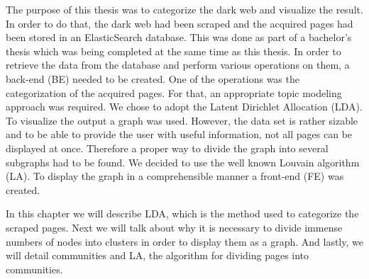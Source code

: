 The purpose of this thesis was to categorize the dark web and visualize the result. In order to do that, the dark web had been scraped and the acquired pages had been stored in an ElasticSearch database. This was done as part of a bachelor's thesis which was being completed at the same time as this thesis. In order to retrieve the data from the database and perform various operations on them, a back-end (BE) needed to be created. One of the operations was the categorization of the acquired pages. For that, an appropriate topic modeling approach was required. We chose to adopt the Latent Dirichlet Allocation (LDA). To visualize the output a graph was used. However, the data set is rather sizable and to be able to provide the user with useful information, not all pages can be displayed at once. Therefore a proper way to divide the graph into several subgraphs had to be found. We decided to use the well known Louvain algorithm (LA). To display the graph in a comprehensible manner a front-end (FE) was created.

In this chapter we will describe LDA,  which is the method used to categorize the scraped pages. Next we will talk about why it is necessary to divide immense numbers of nodes into clusters in order to display them as a graph. And lastly, we will detail communities and LA, the algorithm for dividing pages into communities. 
 
